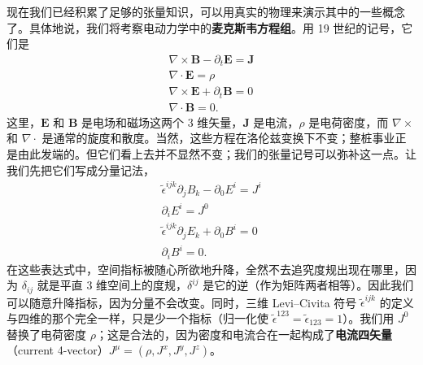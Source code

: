 现在我们已经积累了足够的张量知识，可以用真实的物理来演示其中的一些概念了。具体地说，我们将考察电动力学中的\textbf{麦克斯韦方程组}。用 19 世纪的记号，它们是
\begin{equation*}
\begin{gathered}
\nabla\times\mathbf{B} - \partial_t\mathbf{E} = \mathbf{J}\\
\nabla\cdot\mathbf{E} = \rho\\
\nabla\times\mathbf{E} + \partial_t\mathbf{B} = 0\\
\nabla\cdot\mathbf{B} = 0.
\end{gathered}
\tag{1.92}
\end{equation*}
这里，$\mathbf{E}$ 和 $\mathbf{B}$ 是电场和磁场这两个 3 维矢量，$\mathbf{J}$ 是电流，$\rho$ 是电荷密度，而 $\nabla\times$ 和 $\nabla\cdot$ 是通常的旋度和散度。当然，这些方程在洛伦兹变换下不变；整桩事业正是由此发端的。但它们看上去并不显然不变；我们的张量记号可以弥补这一点。让我们先把它们写成分量记法，
\begin{equation*}
\begin{gathered}
\tilde{\epsilon}^{ijk}\partial_j B_k - \partial_0 E^i = J^i\\
\partial_i E^i = J^0\\
\tilde{\epsilon}^{ijk}\partial_j E_k + \partial_0 B^i = 0\\
\partial_i B^i = 0.
\end{gathered}
\tag{1.93}
\end{equation*}
在这些表达式中，空间指标被随心所欲地升降，全然不去追究度规出现在哪里，因为 $\delta_{ij}$ 就是平直 3 维空间上的度规，$\delta^{ij}$ 是它的逆（作为矩阵两者相等）。因此我们可以随意升降指标，因为分量不会改变。同时，三维 Levi–Civita 符号 $\tilde{\epsilon}^{ijk}$ 的定义与四维的那个完全一样，只是少一个指标（归一化使 $\tilde{\epsilon}^{123}=\tilde{\epsilon}_{123}=1$）。我们用 $J^{0}$ 替换了电荷密度 $\rho$；这是合法的，因为密度和电流合在一起构成了\textbf{电流四矢量}（current 4-vector）$J^{\mu}=(\rho,J^{x},J^{y},J^{z})$。

